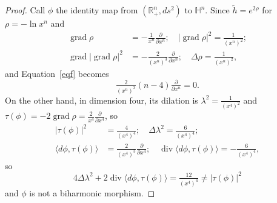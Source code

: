 \documentclass[12pt]{amsart}
\theoremstyle{plain}
\theoremstyle{definition}
\begin{document}
\begin{proof}
Call $\phi$ the identity map from $({{\mathbb R}}^{n}_{+}, ds^2)$ to ${{\mathbb H}}^n$. Since $\tilde{h}
= e^{2\rho}$ for $\rho = -\ln x^{n}$ and
\begin{align*}
\operatorname{grad} \rho &= -\tfrac{1}{x^{n}}\tfrac{\partial}{\partial x^{n}} ; \quad  |\operatorname{grad} \rho|^2 = \tfrac{1}{(x^{n})^2} ;\\
\operatorname{grad} |\operatorname{grad} \rho|^2 &= -\tfrac{2}{(x^{n})^3}\tfrac{\partial}{\partial x^{n}} ; \quad \Delta
\rho = \tfrac{1}{(x^{n})^2},
\end{align*}
and Equation~\eqref{eqf} becomes
$$\tfrac{2}{(x^{n})^3}(n-4) \tfrac{\partial}{\partial x^{n}}=0.$$
On the other hand, in dimension four, its dilation is $\lambda^2 =
\tfrac{1}{(x^{4})^2}$ and $\tau(\phi) = -2 \operatorname{grad} \rho =
\tfrac{2}{x^{4}}\tfrac{\partial}{\partial x^{4}}$, so
\begin{align*}
|\tau(\phi)|^2 &= \tfrac{4}{(x^{4})^4} ; \quad \Delta \lambda^2 = \tfrac{6}{(x^{4})^4} ;\\
\langle d\phi , \tau(\phi) \rangle &= \tfrac{2}{(x^{4})^3}\tfrac{\partial}{\partial
x^{4}} ; \quad \operatorname{div} \langle d\phi , \tau(\phi) \rangle = -\tfrac{6}{(x^{4})^4},
\end{align*}
so
$$ 4\Delta \lambda^2 + 2 \operatorname{div} \langle d\phi , \tau(\phi) \rangle = \tfrac{12}{(x^{4})^4} \neq |\tau(\phi)|^2$$
and $\phi$ is not a biharmonic morphism.
\end{proof}
\end{document}
